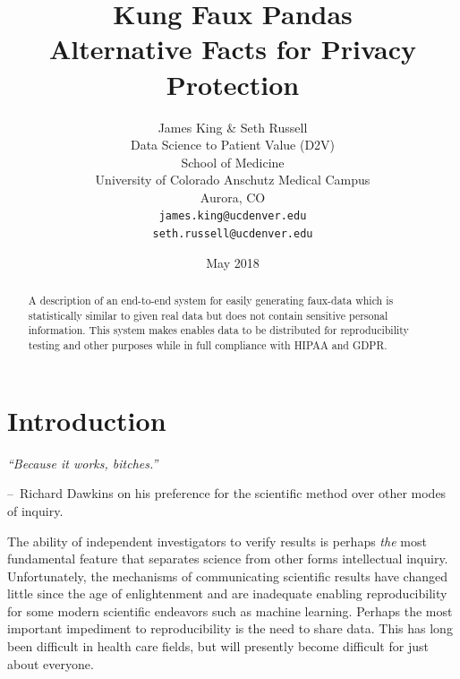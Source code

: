\documentclass{article}
\title{%
  Kung Faux Pandas \\
  \large Alternative Facts for Privacy Protection}
\author{
  James King \& Seth Russell\\
  Data Science to Patient Value (D2V)\\
  School of Medicine \\
  University of Colorado Anschutz Medical Campus\\
  Aurora, CO\\
  \texttt{james.king@ucdenver.edu} \\
  \texttt{seth.russell@ucdenver.edu} \\
  }
\date{May 2018}
\begin{document}

\makeatletter

\newenvironment{chapquote}[2][2em]
  {\setlength{\@tempdima}{#1}%
   \def\chapquote@author{#2}%
   \parshape 1 \@tempdima \dimexpr\textwidth-2\@tempdima\relax%
   \itshape}
  {\par\normalfont\hfill--\ \chapquote@author\hspace*{\@tempdima}\par\bigskip}
\makeatother

\maketitle

\begin{abstract}
A description of an end-to-end system for easily generating faux-data which is statistically similar to given real data but does not contain sensitive personal information.  This system makes enables data to be distributed for reproducibility testing and other purposes while in full compliance with HIPAA and GDPR.
\end{abstract}


\section{Introduction}


\begin{chapquote}{Richard Dawkins on his preference for the scientific method over other modes of inquiry.}
``Because it works, bitches.''
\end{chapquote}

The ability of independent investigators to verify results is perhaps \emph{the} most fundamental feature that separates science from other forms intellectual inquiry.  Unfortunately, the mechanisms of communicating scientific results have changed little since the age of enlightenment and are inadequate enabling reproducibility for some modern scientific endeavors such as machine learning.  Perhaps the most important impediment to reproducibility is the need to share data.  This has long been difficult in health care fields, but will presently become difficult for just about everyone.
\end{document}
